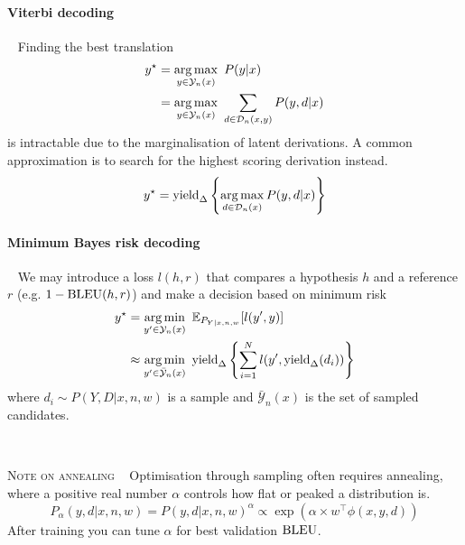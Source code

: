 \paragraph{Viterbi decoding} ~ Finding the best translation 
\begin{equation}\label{eq:besty}
\begin{aligned}
y^\star &= \operatorname*{arg\,max}_{y \in \mathcal Y_n(x)} ~ P(y|x) \\
 &= \operatorname*{arg\,max}_{y \in \mathcal Y_n(x)} ~ \sum_{d \in \mathcal D_n(x, y)} P(y, d|x)
\end{aligned}
\end{equation}
is intractable due to the marginalisation of latent derivations. A common approximation is to search for the highest scoring derivation instead.
\begin{equation}
y^\star = \operatorname{yield}_\Delta \left\{ \operatorname*{arg\,max}_{d \in \mathcal D_n(x)} P(y, d|x) \right\}
\end{equation}


\paragraph{Minimum Bayes risk decoding}  ~ We may introduce a loss $l(h, r)$ that compares a hypothesis $h$ and a reference $r$ (e.g. $1 - \operatorname{BLEU}(h, r)$) and make a decision based on minimum risk
\begin{equation}
\begin{aligned}
y^\star &= \operatorname*{arg\,min}_{y' \in \mathcal Y_n(x)} ~ \mathbb E_{P_{Y|x, n, w}}[l(y', y)]  \\
 &\approx \operatorname*{arg\,min}_{y' \in \bar{\mathcal Y}_n(x)} ~ \operatorname{yield}_\Delta \left\{ \sum_{i=1}^N  l(y', \operatorname{yield}_\Delta(d_i)) \right\} 
\end{aligned}
\end{equation}
where $d_i \sim P(Y, D|x, n, w)$ is a sample and $\bar{\mathcal Y}_n(x)$ is the set of sampled candidates.

~

\noindent\textsc{Note on annealing} ~ Optimisation through sampling often requires annealing, where a positive real number $\alpha$ controls how flat or peaked a distribution is.
\begin{equation}
	P_\alpha(y, d|x, n, w) = P(y, d|x, n, w)^\alpha \propto \exp\left(\alpha \times w^\top \phi(x, y, d)\right)
\end{equation}
After training you can tune $\alpha$ for best validation $\operatorname{BLEU}$.


